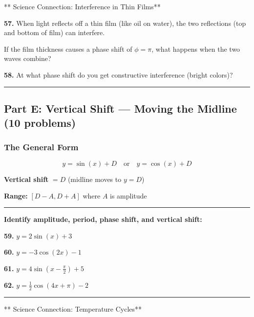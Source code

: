 \documentclass[
  11pt,
]{article}
\begin{document}
** Science Connection: Interference in Thin Films**

\textbf{57.} When light reflects off a thin film (like oil on water),
the two reflections (top and bottom of film) can interfere.

If the film thickness causes a phase shift of \(\phi = \pi\), what
happens when the two waves combine?

\textbf{58.} At what phase shift do you get constructive interference
(bright colors)?

\begin{center}\rule{0.5\linewidth}{0.5pt}\end{center}

\hypertarget{part-e-vertical-shift-moving-the-midline-10-problems}{%
\subsection{Part E: Vertical Shift --- Moving the Midline (10
problems)}\label{part-e-vertical-shift-moving-the-midline-10-problems}}

\hypertarget{the-general-form-3}{%
\subsubsection{The General Form}\label{the-general-form-3}}

\[y = \sin(x) + D \quad \text{or} \quad y = \cos(x) + D\]

\textbf{Vertical shift} \(= D\) (midline moves to \(y = D\))

\textbf{Range:} \([D - A, D + A]\) where \(A\) is amplitude

\begin{center}\rule{0.5\linewidth}{0.5pt}\end{center}

\textbf{Identify amplitude, period, phase shift, and vertical shift:}

\textbf{59.} \(y = 2\sin(x) + 3\)

\textbf{60.} \(y = -3\cos(2x) - 1\)

\textbf{61.} \(y = 4\sin\left(x - \frac{\pi}{2}\right) + 5\)

\textbf{62.} \(y = \frac{1}{2}\cos(4x + \pi) - 2\)

\begin{center}\rule{0.5\linewidth}{0.5pt}\end{center}

** Science Connection: Temperature Cycles**
\end{document}
